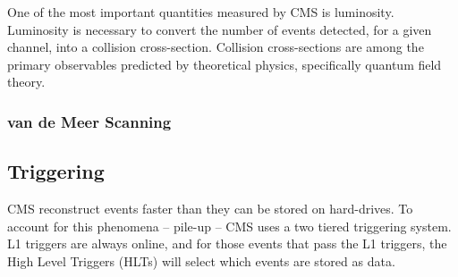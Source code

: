 One of the most important quantities measured by CMS is luminosity. Luminosity is necessary to convert the number of events detected, for a given channel, into a collision cross-section. Collision cross-sections are among the primary observables predicted by theoretical physics, specifically quantum field theory.

\subsubsection{van de Meer Scanning}

\subsection{Triggering}

CMS reconstruct events faster than they can be stored on hard-drives. To account for this phenomena -- pile-up -- CMS uses a two tiered triggering system. L1 triggers are always online, and for those events that pass the L1 triggers, the High Level Triggers (HLTs) will select which events are stored as data.